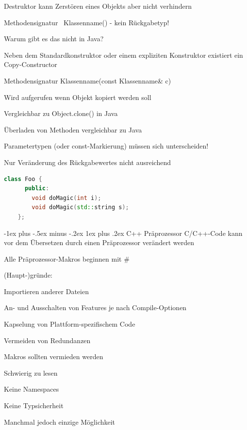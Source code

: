 \documentclass[10pt]{article}
\makeatletter
\renewcommand{\subsubsection}{\@startsection{subsubsection}{3}{0mm}%
                                {-1ex plus -.5ex minus -.2ex}%
                                {1ex plus .2ex}%
                                {\normalfont\small\bfseries}}
\makeatother
\begin{document}
\begin{itemize*}
\begin{itemize*}
\begin{itemize*}
      \item Destruktor kann Zerstören eines Objekts aber nicht verhindern
      \item Methodensignatur ~Klassenname() - kein Rückgabetyp!
      \item Warum gibt es das nicht in Java?
    \end{itemize*}
    \item Neben dem Standardkonstruktor oder einem expliziten Konstruktor existiert ein Copy-Constructor
    \begin{itemize*}
      \item Methodensignatur Klassenname(const Klassenname\& c)
      \item Wird aufgerufen wenn Objekt kopiert werden soll
      \item Vergleichbar zu Object.clone() in Java
    \end{itemize*}
  \end{itemize*}
  \item Überladen von Methoden vergleichbar zu Java
  \begin{itemize*}
    \item Parametertypen (oder const-Markierung) müssen sich unterscheiden!
    \item Nur Veränderung des Rückgabewertes nicht ausreichend
    \begin{lstlisting}[language=C++]
    class Foo {
      public:
        void doMagic(int i);
        void doMagic(std::string s);
    };
    \end{lstlisting}
  \end{itemize*}
\end{itemize*}

\subsubsection{C++ Präprozessor}
C/C++-Code kann vor dem Übersetzen durch einen Präprozessor verändert werden
\begin{itemize*}
  \item Alle Präprozessor-Makros beginnen mit \#
  \item (Haupt-)gründe:
  \begin{itemize*}
    \item Importieren anderer Dateien
    \item An- und Ausschalten von Features je nach Compile-Optionen
    \item Kapselung von Plattform-spezifischem Code
    \item Vermeiden von Redundanzen
  \end{itemize*}
  \item Makros sollten vermieden werden
  \begin{itemize*}
    \item Schwierig zu lesen
    \item Keine Namespaces
    \item Keine Typsicherheit
  \end{itemize*}
  \item Manchmal jedoch einzige Möglichkeit
\end{itemize*}
\end{document}
